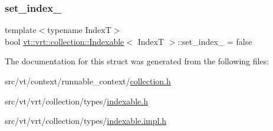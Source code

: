 \mbox{\label{structvt_1_1vrt_1_1collection_1_1_indexable_a946600975ab9eb4d1b122b6267bea35e}} 
\subsubsection{\texorpdfstring{set\+\_\+index\+\_\+}{set\_index\_}}
{\footnotesize\ttfamily template$<$typename IndexT$>$ \\
bool \hyperlink{structvt_1_1vrt_1_1collection_1_1_indexable}{vt\+::vrt\+::collection\+::\+Indexable}$<$ IndexT $>$\+::set\+\_\+index\+\_\+ = false\hspace{0.3cm}{\ttfamily [private]}}



The documentation for this struct was generated from the following files\+:\begin{DoxyCompactItemize}
\item 
src/vt/context/runnable\+\_\+context/\hyperlink{collection_8h}{collection.\+h}\item 
src/vt/vrt/collection/types/\hyperlink{indexable_8h}{indexable.\+h}\item 
src/vt/vrt/collection/types/\hyperlink{indexable_8impl_8h}{indexable.\+impl.\+h}\end{DoxyCompactItemize}

